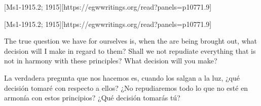 [Ms1-1915.2; 1915][https://egwwritings.org/read?panels=p10771.9]


[Ms1-1915.2; 1915][https://egwwritings.org/read?panels=p10771.9]


The true question we have for ourselves is, when the  are being brought out, what decision will I make in regard to them? Shall we not repudiate everything that is not in harmony with these principles? What decision will you make?


La verdadera pregunta que nos hacemos es, cuando los  salgan a la luz, ¿qué decisión tomaré con respecto a ellos? ¿No repudiaremos todo lo que no esté en armonía con estos principios? ¿Qué decisión tomarás tú?






